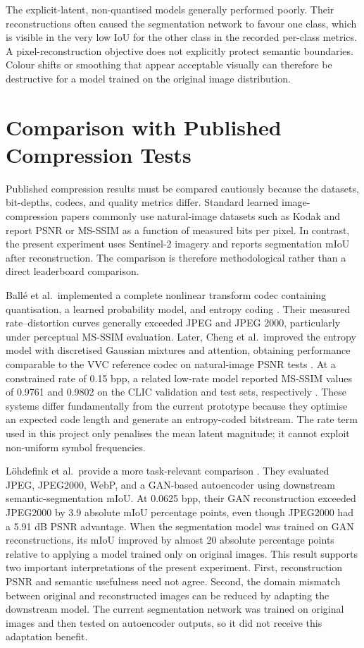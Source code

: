 \documentclass[10pt,a4paper]{article}
\begin{document}
The explicit-latent, non-quantised models generally performed poorly. Their
reconstructions often caused the segmentation network to favour one class,
which is visible in the very low IoU for the other class in the recorded
per-class metrics. A pixel-reconstruction objective does not explicitly
protect semantic boundaries. Colour shifts or smoothing that appear
acceptable visually can therefore be destructive for a model trained on the
original image distribution.

\section{Comparison with Published Compression Tests}

Published compression results must be compared cautiously because the
datasets, bit-depths, codecs, and quality metrics differ. Standard learned
image-compression papers commonly use natural-image datasets such as Kodak and
report PSNR or MS-SSIM as a function of measured bits per pixel. In contrast,
the present experiment uses Sentinel-2 imagery and reports segmentation mIoU
after reconstruction. The comparison is therefore methodological rather than
a direct leaderboard comparison.

Ball\'e et al.\ implemented a complete nonlinear transform codec containing
quantisation, a learned probability model, and entropy coding
\cite{balle2017}. Their measured rate--distortion curves generally exceeded
JPEG and JPEG 2000, particularly under perceptual MS-SSIM evaluation. Later,
Cheng et al.\ improved the entropy model with discretised Gaussian mixtures
and attention, obtaining performance comparable to the VVC reference codec on
natural-image PSNR tests \cite{cheng2020}. At a constrained rate of
0.15 bpp, a related low-rate model reported MS-SSIM values of 0.9761 and
0.9802 on the CLIC validation and test sets, respectively
\cite{cheng2020lowrate}. These systems differ fundamentally from the current
prototype because they optimise an expected code length and generate an
entropy-coded bitstream. The rate term used in this project only penalises the
mean latent magnitude; it cannot exploit non-uniform symbol frequencies.

L\"ohdefink et al.\ provide a more task-relevant comparison
\cite{lohdefink2019}. They evaluated JPEG, JPEG2000, WebP, and a GAN-based
autoencoder using downstream semantic-segmentation mIoU. At 0.0625 bpp, their
GAN reconstruction exceeded JPEG2000 by 3.9 absolute mIoU percentage points,
even though JPEG2000 had a 5.91 dB PSNR advantage. When the segmentation model
was trained on GAN reconstructions, its mIoU improved by almost 20 absolute
percentage points relative to applying a model trained only on original
images. This result supports two important interpretations of the present
experiment. First, reconstruction PSNR and semantic usefulness need not agree.
Second, the domain mismatch between original and reconstructed images can be
reduced by adapting the downstream model. The current segmentation network was
trained on original images and then tested on autoencoder outputs, so it did
not receive this adaptation benefit.
\end{document}
